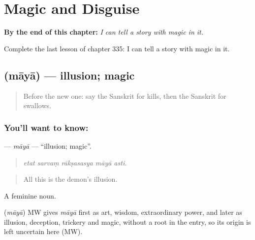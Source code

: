 
\chapter{Magic and Disguise}
\label{ch:sa-magic-and-disguise}

\begin{chapteropening}
\textbf{By the end of this chapter:} \emph{I can tell a story with magic in it.}

Complete the last lesson of chapter 335: I can tell a story with magic in it.
\end{chapteropening}

\section[\texorpdfstring{\sk{माया} (māyā)}{माया (māyā)}]{ (māyā) — illusion; magic}

\label{lesson:SA-C335-maya}



\begin{quote}
Before the new one: say the Sanskrit for kills, then the Sanskrit for swallows.
\end{quote}

\subsection*{You'll want to know: }
\textbf{} — \emph{māyā} — \textquotedblleft{}illusion; magic\textquotedblright{}.

\begin{quote}
    
\end{quote}

\begin{quote}
\emph{etat sarvaṃ rākṣasasya māyā asti.}
\end{quote}

\begin{quote}
All this is the demon's illusion.
\end{quote}

A feminine noun.

\begin{cousinweb}
\textbf{} (\emph{māyā}) MW gives \emph{māyā} first as art, wisdom, extraordinary power, and later as illusion, deception, trickery and magic, without a root in the entry, so its origin is left uncertain here (MW).
\end{cousinweb}

